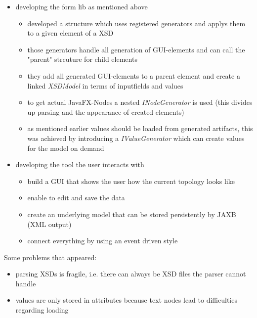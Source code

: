 \documentclass[10pt,a4paper]{report}
\begin{document}
	\begin{itemize}
		\item developing the form lib as mentioned above
		\begin{itemize}
			\item developed a structure which uses registered generators and applys them to a given element of a XSD
			\item those generators handle all generation of GUI-elements and can call the "parent" strcuture for child elements
			\item they add all generated GUI-elements to a parent element and create a linked \textit{XSDModel} in terms of inputfields and values 
			\item to get actual JavaFX-Nodes a nested \textit{INodeGenerator} is used (this divides up parsing and the appearance of created elements)
			\item as mentioned earlier values should be loaded from generated artifacts, this was achieved by introducing a \textit{IValueGenerator} which can create values for the model on demand
		\end{itemize}
		\item developing the tool the user interacts with
		\begin{itemize}
			\item build a GUI that shows the user how the current topology looks like 
			\item enable to edit and save the data 
			\item create an underlying model that can be stored persistently by JAXB (XML output)
			\item connect everything by using an event driven style 
		\end{itemize}
	\end{itemize}
	
	Some problems that appeared:
	\begin{itemize}
		\item parsing XSDs is fragile, i.e. there can always be XSD files the parser cannot handle 
		\item values are only stored in attributes because text nodes lead to difficulties regarding loading 
	\end{itemize}
\end{document}
